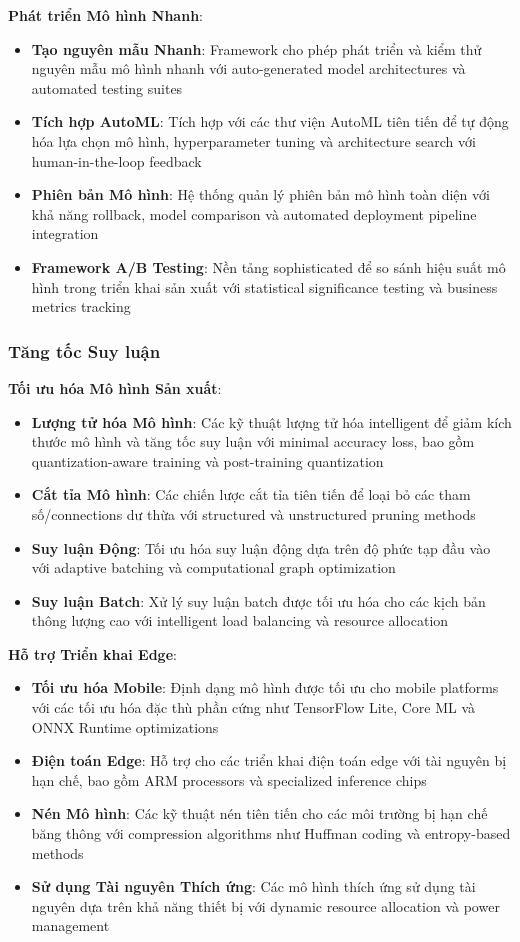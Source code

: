 \textbf{Phát triển Mô hình Nhanh}:
\begin{itemize}
    \item \textbf{Tạo nguyên mẫu Nhanh}: Framework cho phép phát triển và kiểm thử nguyên mẫu mô hình nhanh với auto-generated model architectures và automated testing suites
    \item \textbf{Tích hợp AutoML}: Tích hợp với các thư viện AutoML tiên tiến để tự động hóa lựa chọn mô hình, hyperparameter tuning và architecture search với human-in-the-loop feedback
    \item \textbf{Phiên bản Mô hình}: Hệ thống quản lý phiên bản mô hình toàn diện với khả năng rollback, model comparison và automated deployment pipeline integration
    \item \textbf{Framework A/B Testing}: Nền tảng sophisticated để so sánh hiệu suất mô hình trong triển khai sản xuất với statistical significance testing và business metrics tracking
\end{itemize}

\subsubsection{Tăng tốc Suy luận}

\textbf{Tối ưu hóa Mô hình Sản xuất}:
\begin{itemize}
    \item \textbf{Lượng tử hóa Mô hình}: Các kỹ thuật lượng tử hóa intelligent để giảm kích thước mô hình và tăng tốc suy luận với minimal accuracy loss, bao gồm quantization-aware training và post-training quantization
    \item \textbf{Cắt tỉa Mô hình}: Các chiến lược cắt tỉa tiên tiến để loại bỏ các tham số/connections dư thừa với structured và unstructured pruning methods
    \item \textbf{Suy luận Động}: Tối ưu hóa suy luận động dựa trên độ phức tạp đầu vào với adaptive batching và computational graph optimization
    \item \textbf{Suy luận Batch}: Xử lý suy luận batch được tối ưu hóa cho các kịch bản thông lượng cao với intelligent load balancing và resource allocation
\end{itemize}

\textbf{Hỗ trợ Triển khai Edge}:
\begin{itemize}
    \item \textbf{Tối ưu hóa Mobile}: Định dạng mô hình được tối ưu cho mobile platforms với các tối ưu hóa đặc thù phần cứng như TensorFlow Lite, Core ML và ONNX Runtime optimizations
    \item \textbf{Điện toán Edge}: Hỗ trợ cho các triển khai điện toán edge với tài nguyên bị hạn chế, bao gồm ARM processors và specialized inference chips
    \item \textbf{Nén Mô hình}: Các kỹ thuật nén tiên tiến cho các môi trường bị hạn chế băng thông với compression algorithms như Huffman coding và entropy-based methods
    \item \textbf{Sử dụng Tài nguyên Thích ứng}: Các mô hình thích ứng sử dụng tài nguyên dựa trên khả năng thiết bị với dynamic resource allocation và power management
\end{itemize}


